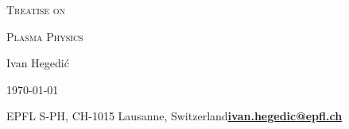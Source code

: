 
\thispagestyle{empty}

\vspace*{6.5cm}

\begin{center}
    \Large\textsc{Treatise on}
    
    \textsc{Plasma Physics}

    \vspace*{15pt}

    \LARGE\textemdash\textemdash

    \vspace*{15pt}

    \large Ivan Hegedić

    \vspace*{10pt}

    \LARGE\textemdash\textemdash

    \vspace*{15pt}

    \large\today
    
    \vspace*{10cm}

    \normalsize EPFL S-PH, CH-1015 Lausanne, Switzerland\quad\quad\color{black}\href{mailto:ivan.hegedic@epfl.ch}{\textbf{ivan.hegedic@epfl.ch}}\color{black}
\end{center}

\newpage
